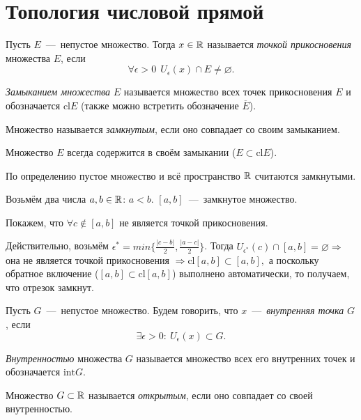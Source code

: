 \section{Топология числовой прямой}
\begin{definition}
    Пусть $E$~---~непустое множество. Тогда $x \in \mathbb{R}$ называется \textit{точкой прикосновения} множества $E$, если
    $$ \forall \epsilon > 0 \ \ U_{\epsilon} (x) \cap E \neq \varnothing.$$
\end{definition}
\begin{definition}
    \textit{Замыканием множества} $E$ называется множество всех точек прикосновения $E$ и обозначается $\text{cl}E$ (также можно встретить обозначение $\overline{E}$).
\end{definition}
\begin{definition}
    Множество называется \textit{замкнутым}, если оно совпадает со своим замыканием.
\end{definition}
\begin{note}
    Множество $E$ всегда содержится в своём замыкании ($E \subset \text{cl}E$).
\end{note}
\begin{note}
    По определению пустое множество и всё пространство $\mathbb{R}$ считаются замкнутыми.
\end{note}
\begin{example}
    Возьмём два числа $a, b \in \mathbb{R}$: $a < b$. $[ a, b ]$~---~замкнутое множество.

    Покажем, что $\forall c \notin [ a, b ]$ не является точкой прикосновения.

    Действительно, возьмём $\epsilon^{*} = min \{\frac{|c - b|}{2}, \frac{|a - c|}{2} \}$. Тогда $U_{\epsilon^{*}} (c) \cap [ a, b ] = \varnothing \Rightarrow$ она не является точкой прикосновения $\Rightarrow \text{cl}[ a, b ] \subset [ a, b ],$ а поскольку обратное включение ($[ a, b ] \subset \text{cl} [ a, b ]$) выполнено автоматически, то получаем, что отрезок замкнут.
\end{example}
\begin{definition}
    Пусть $G$~---~непустое множество. Будем говорить, что $x$~---~\textit{внутренняя точка} $G$, если $$\exists \epsilon > 0: \  U_{\epsilon} (x) \subset G.$$
\end{definition}
\begin{definition}
    \textit{Внутренностью} множества $G$ называется множество всех его внутренних точек и обозначается $\text{int}G$.
\end{definition}
\begin{definition}
    Множество $G \subset \mathbb{R}$ называется \textit{открытым}, если оно совпадает со своей внутренностью.
\end{definition}
